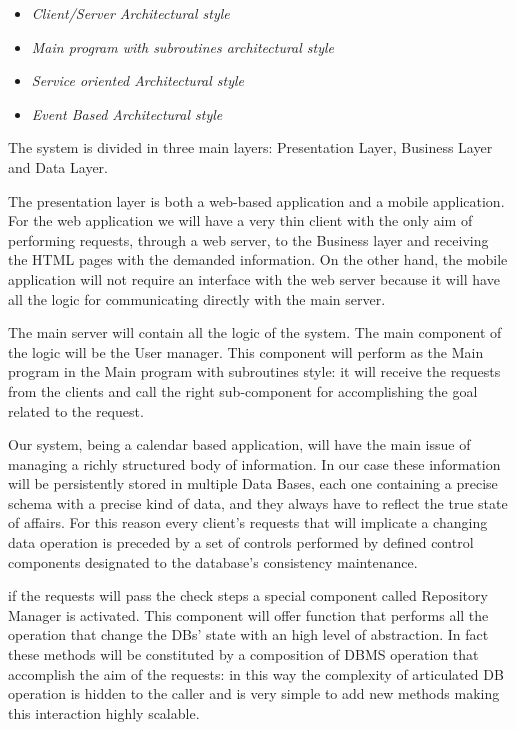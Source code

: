 \begin{itemize}
\setlength{\leftskip}{0.5cm}
\item \emph{Client/Server Architectural style}
\item \emph{Main program with subroutines architectural style}
\item \emph{Service oriented Architectural style}
\item \emph{Event Based Architectural style}
\end{itemize}

The system is divided in three main layers: Presentation Layer, Business Layer and Data Layer.

The presentation layer is both a web-based application and a mobile application. For the web application we will have a very thin client with the only aim of performing requests, through a web server, to the Business layer and receiving the HTML pages with the demanded information.
On the other hand, the mobile application will not require an interface with the web server because it will have all the logic for communicating directly with the main server.

The main server will contain all the logic of the system. The main component of the logic will be the User manager. This component will perform as the Main program in the Main program with subroutines style: it will receive the requests from the clients and call the right sub-component for accomplishing the goal related to the request.

Our system, being a calendar based application, will have the main issue of managing a richly structured body of information. In our case these information will be persistently stored in multiple Data Bases, each one containing a precise schema with a precise kind of data, and they always have to reflect the true state of affairs. For this reason every client's requests that will implicate a changing data operation is preceded by a set of controls performed by defined control components designated to the database’s consistency maintenance.

if the requests will pass the check steps a special component called Repository Manager is activated. This component will offer function that performs all the operation that change the DBs’ state with an high level of abstraction. In fact these methods will be constituted by a composition of DBMS operation that accomplish the aim of the requests: in this way the complexity of articulated DB operation is hidden to the caller and is very simple to add new methods making this interaction highly scalable.


